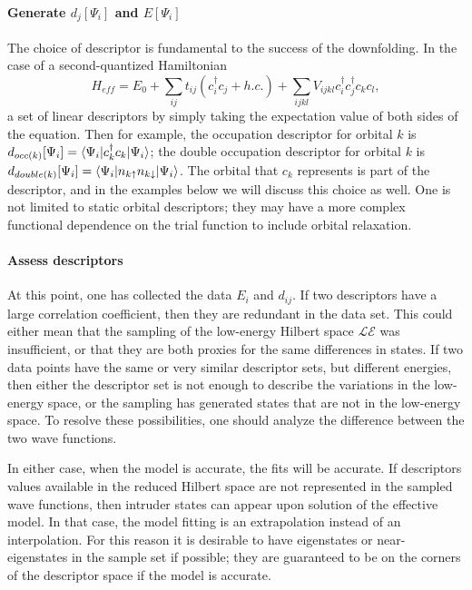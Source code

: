 \documentclass[aps, prb, 11pt]{revtex4-1}
\begin{document}
\paragraph{Generate $d_j[\Psi_i]$ and $E[\Psi_i]$} 
The choice of descriptor is fundamental to the success of the downfolding. 
In the case of a second-quantized Hamiltonian
\begin{equation}
H_{eff} = E_0 + \sum_{ij} t_{ij} (c_i^\dagger c_j + h.c.) + \sum_{ijkl} V_{ijkl} c_i^\dagger c_j^\dagger c_k c_l,
\end{equation}
a set of linear descriptors by simply taking the expectation value of both sides of the equation. 
Then for example, the occupation descriptor for orbital $k$ is $d_{occ(k)}[\Psi_i] = \braket{\Psi_i | c_k^\dagger c_k | \Psi_i}$; the double occupation descriptor for orbital $k$ is $d_{double(k)}[\Psi_i] = \braket{\Psi_i | n_{k\uparrow}n_{k\downarrow} | \Psi_i}$. 
The orbital that $c_k$ represents is part of the descriptor, and in the examples below we will discuss this choice as well.
One is not limited to static orbital descriptors; they may have a more complex functional dependence on the trial function to include orbital relaxation.

 
\paragraph{Assess descriptors}
At this point, one has collected the data $E_i$ and $d_{ij}$. 
If two descriptors have a large correlation coefficient, then they are redundant in the data set. 
This could either mean that the sampling of the low-energy Hilbert space $\mathcal{LE}$ was insufficient, or that they are both proxies for the same differences in states. 
If two data points have the same or very similar descriptor sets, but different energies, then either the descriptor set is not enough to describe the variations in the low-energy space, or the sampling has generated states that are not in the low-energy space.
To resolve these possibilities, one should analyze the difference between the two wave functions.  

In either case, when the model is accurate, the fits will be accurate.
If descriptors values available in the reduced Hilbert space are not represented in the sampled wave functions, then intruder states can appear upon solution of the effective model. 
In that case, the model fitting is an extrapolation instead of an interpolation.
For this reason it is desirable to have eigenstates or near-eigenstates in the sample set if possible; they are guaranteed to be on the corners of the descriptor space if the model is accurate.
\end{document}
